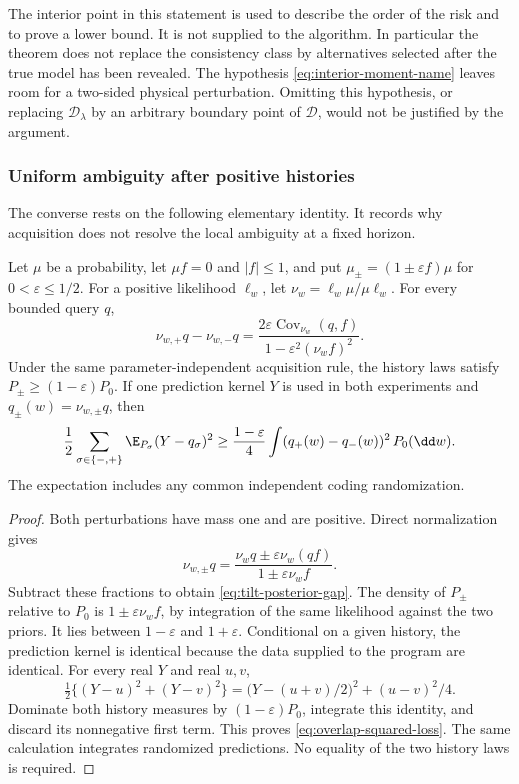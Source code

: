 The interior point in this statement is used to describe the order of the
risk and to prove a lower bound. It is not supplied to the algorithm.
In particular the theorem does not replace the consistency class by
alternatives selected after the true model has been revealed. The
hypothesis \eqref{eq:interior-moment-name} leaves room for a two-sided
physical perturbation. Omitting this hypothesis, or replacing
$\mathcal D_\lambda$ by an arbitrary boundary point of $\mathcal D$,
would not be justified by the argument.

\subsubsection{Uniform ambiguity after positive histories}
The converse rests on the following elementary identity. It records why
acquisition does not resolve the local ambiguity at a fixed horizon.

\begin{lemma}
\label{lem:overlap-tilt}
Let $\mu$ be a probability, let $\mu f=0$ and $|f|\le1$, and put
$\mu_\pm=(1\pm\varepsilon f)\mu$ for $0<\varepsilon\le1/2$.
For a positive likelihood $\ell_w$, let
$\nu_w=\ell_w\mu/\mu\ell_w$. For every bounded query $q$,
\begin{equation}\label{eq:tilt-posterior-gap}
 \nu_{w,+}q-\nu_{w,-}q
 =\frac{2\varepsilon\operatorname{Cov}_{\nu_w}(q,f)}
        {1-\varepsilon^2(\nu_w f)^2}.
\end{equation}
Under the same parameter-independent acquisition rule, the history laws
satisfy $P_\pm\ge(1-\varepsilon)P_0$. If one prediction kernel $Y$
is used in both experiments and $q_\pm(w)=\nu_{w,\pm}q$, then
\begin{equation}\label{eq:overlap-squared-loss}
 \frac12\sum_{\sigma\in\{-,+\}}\E_{P_\sigma}(Y-q_\sigma)^2
 \ge\frac{1-\varepsilon}{4}
       \int(q_+(w)-q_-(w))^2\,P_0(\dd w).
\end{equation}
The expectation includes any common independent coding randomization.
\end{lemma}
\begin{proof}
Both perturbations have mass one and are positive. Direct normalization
gives
\[
 \nu_{w,\pm}q=
 \frac{\nu_w q\pm\varepsilon\nu_w(qf)}{1\pm\varepsilon\nu_w f}.
\]
Subtract these fractions to obtain \eqref{eq:tilt-posterior-gap}.
The density of $P_\pm$ relative to $P_0$ is
$1\pm\varepsilon\nu_w f$, by integration of the same likelihood
against the two priors. It lies between $1-\varepsilon$ and
$1+\varepsilon$. Conditional on a given history, the prediction kernel
is identical because the data supplied to the program are identical.
For every real $Y$ and real $u,v$,
\[
 \tfrac12\{(Y-u)^2+(Y-v)^2\}
 =\bigl(Y-(u+v)/2\bigr)^2+(u-v)^2/4.
\]
Dominate both history measures by $(1-\varepsilon)P_0$, integrate
this identity, and discard its nonnegative first term. This proves
\eqref{eq:overlap-squared-loss}. The same calculation integrates
randomized predictions. No equality of the two history laws is required.
\end{proof}

